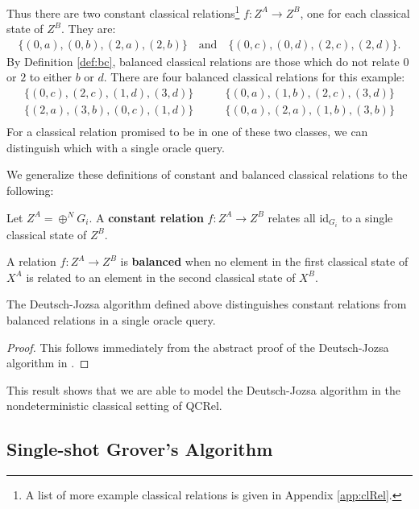 \begin{example}
Thus there are two constant classical relations\footnote{A list of more example classical relations is given in Appendix \ref{app:clRel}.} $f:Z^A\to Z^B$, one for each classical state of $Z^B$. They are:
\begin{align*}
\{ (0,a),(0,b) ,(2,a),(2,b) \} \quad \mbox{and} \quad
\{ (0,c),(0,d), (2,c),(2,d) \}.
\end{align*}
By Definition \ref{def:bc}, balanced classical relations are those which do not relate $0$ or $2$ to either $b$ or $d$. There are four balanced classical relations for this example:
\begin{align*}
\{(0,c),(2,c),(1,d),(3,d)\} &\qquad \{(0,a),(1,b),(2,c),(3,d)\} \\
\{(2,a),(3,b),(0,c),(1,d)\} &\qquad \{(0,a),(2,a),(1,b),(3,b)\} \\
\end{align*}
For a classical relation promised to be in one of these two classes, we can distinguish which with a single oracle query.
\end{example}

We generalize these definitions of constant and balanced classical relations to the following:
\begin{defn}
\label{def:const}
Let $Z^A=\oplus^NG_i$. A \textbf{constant relation} $f:Z^{A}\to Z^{B}$ relates all id$_{G_i}$ to a single classical state of $Z^B$.
\end{defn}

\begin{defn}
\label{def:balanced}
A relation $f:Z^{A}\to Z^{B}$ is \textbf{balanced} when no element in the first classical state of $X^{A}$ is related to an element in the second classical state of $X^{B}$.
\end{defn}

\begin{theorem}
\label{thm:dj_speedup}
The Deutsch-Jozsa algorithm defined above distinguishes constant relations from balanced relations in a single oracle query.
\end{theorem}
\begin{proof}
This follows immediately from the abstract proof of the Deutsch-Jozsa algorithm in \cite{vicary-tqa}.
\end{proof}

This result shows that we are able to model the Deutsch-Jozsa algorithm in the nondeterministic classical setting of QCRel.

\subsection{Single-shot Grover's Algorithm}

